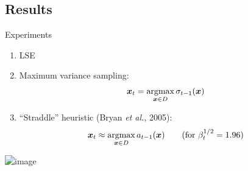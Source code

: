 \documentclass[10pt,mathserif]{beamer}
\newcommand{\acl}{\textsf{LSE}\xspace}
\begin{document}
\subsection*{Results}
\begin{frame}
\begin{center}
{\large Experiments}
\end{center}
\begin{enumerate}
\item \acl
\item<2-> Maximum variance sampling:
\vspace{-0.5em}
\begin{align*}
\*x_t = \argmax_{\*x\in D} \sigma_{t-1}(\*x)
\end{align*}
\item<3-> ``Straddle'' heuristic (Bryan \emph{et al.}, 2005):
\vspace{-0.5em}
\begin{align*}
\*x_t \approx \argmax_{\*x\in D} a_{t-1}(\*x) \tag{for $\beta_t^{1/2} = 1.96$}
\end{align*}
\end{enumerate}
\end{frame}

\begin{frame}
\begin{center}
\hspace{4pt}\includegraphics<1->[width=4in]{figures/limno_chl_ls}\\[0.5em]
\end{center}
\end{frame}
\end{document}
